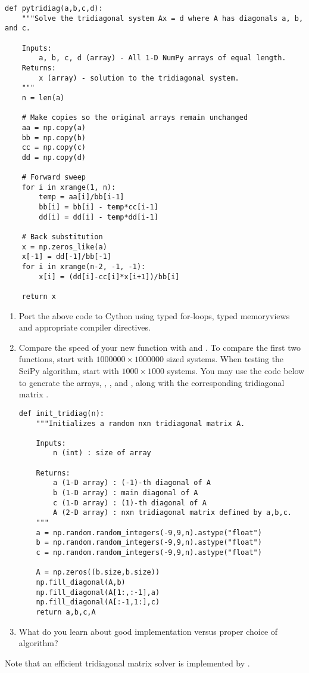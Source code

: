 \begin{lstlisting}
def pytridiag(a,b,c,d):
    """Solve the tridiagonal system Ax = d where A has diagonals a, b, and c.

    Inputs:
        a, b, c, d (array) - All 1-D NumPy arrays of equal length.
    Returns:
        x (array) - solution to the tridiagonal system.
    """
    n = len(a)

    # Make copies so the original arrays remain unchanged
    aa = np.copy(a)
    bb = np.copy(b)
    cc = np.copy(c)
    dd = np.copy(d)

    # Forward sweep
    for i in xrange(1, n):
        temp = aa[i]/bb[i-1]
        bb[i] = bb[i] - temp*cc[i-1]
        dd[i] = dd[i] - temp*dd[i-1]

    # Back substitution
    x = np.zeros_like(a)
    x[-1] = dd[-1]/bb[-1]
    for i in xrange(n-2, -1, -1):
        x[i] = (dd[i]-cc[i]*x[i+1])/bb[i]

    return x
\end{lstlisting}

\begin{problem} \label{prob:tridiag}
\leavevmode
\begin{enumerate}
\item Port the above code to Cython using typed for-loops, typed memoryviews and appropriate compiler directives.
\item Compare the speed of your new function with  and .
To compare the first two functions, start with $1000000 \times 1000000$ sized systems.
When testing the SciPy algorithm, start with $1000 \times 1000$ systems. You may use the code below to generate the arrays, , , and , along with the corresponding tridiagonal matrix .
\begin{lstlisting}
def init_tridiag(n):
    """Initializes a random nxn tridiagonal matrix A.

    Inputs:
        n (int) : size of array

    Returns:
        a (1-D array) : (-1)-th diagonal of A
        b (1-D array) : main diagonal of A
        c (1-D array) : (1)-th diagonal of A
        A (2-D array) : nxn tridiagonal matrix defined by a,b,c.
    """
    a = np.random.random_integers(-9,9,n).astype("float")
    b = np.random.random_integers(-9,9,n).astype("float")
    c = np.random.random_integers(-9,9,n).astype("float")

    A = np.zeros((b.size,b.size))
    np.fill_diagonal(A,b)
    np.fill_diagonal(A[1:,:-1],a)
    np.fill_diagonal(A[:-1,1:],c)
    return a,b,c,A
\end{lstlisting}
\item What do you learn about good implementation versus proper choice of algorithm?
\end{enumerate}
Note that an efficient tridiagonal matrix solver is implemented by .
\end{problem}

